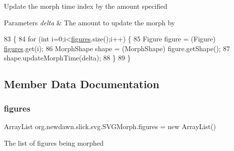 Update the morph time index by the amount specified


\begin{DoxyParams}{Parameters}
{\em delta} & The amount to update the morph by \\
\hline
\end{DoxyParams}

\begin{DoxyCode}
83                                              \{
84         \textcolor{keywordflow}{for} (\textcolor{keywordtype}{int} i=0;i<\mbox{\hyperlink{classorg_1_1newdawn_1_1slick_1_1svg_1_1_s_v_g_morph_ab3f69a342347ec5d6fa4c65aa6671e4b}{figures}}.size();i++) \{
85             Figure figure = (Figure) \mbox{\hyperlink{classorg_1_1newdawn_1_1slick_1_1svg_1_1_s_v_g_morph_ab3f69a342347ec5d6fa4c65aa6671e4b}{figures}}.get(i);
86             MorphShape shape = (MorphShape) figure.getShape();
87             shape.updateMorphTime(delta);
88         \}
89     \}
\end{DoxyCode}


\subsection{Member Data Documentation}
\mbox{\label{classorg_1_1newdawn_1_1slick_1_1svg_1_1_s_v_g_morph_ab3f69a342347ec5d6fa4c65aa6671e4b}} 
\subsubsection{\texorpdfstring{figures}{figures}}
{\footnotesize\ttfamily Array\+List org.\+newdawn.\+slick.\+svg.\+S\+V\+G\+Morph.\+figures = new Array\+List()\hspace{0.3cm}{\ttfamily [private]}}

The list of figures being morphed 